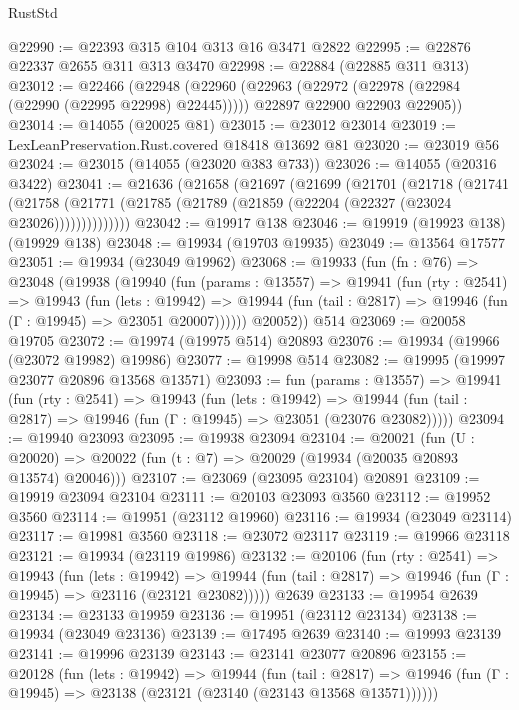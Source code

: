 \begin{lexlean}{RustStd}
\begin{coremodule}
@22990 := @22393 @315 @104 @313 @16 @3471 @2822
@22995 := @22876 @22337 @2655 @311 @313 @3470
@22998 := @22884 (@22885 @311 @313)
@23012 := @22466
    (@22948
      (@22960
        (@22963 (@22972 (@22978 (@22984 (@22990 (@22995 @22998) @22445)))))
        @22897
        @22900
        @22903
        @22905))
@23014 := @14055 (@20025 @81)
@23015 := @23012 @23014
@23019 := LexLeanPreservation.Rust.covered @18418 @13692 @81
@23020 := @23019 @56
@23024 := @23015 (@14055 (@23020 @383 @733))
@23026 := @14055 (@20316 @3422)
@23041 := @21636
    (@21658
      (@21697
        (@21699
          (@21701
            (@21718
              (@21741
                (@21758 (@21771 (@21785 (@21789 (@21859 (@22204 (@22327 (@23024 @23026))))))))))))))
@23042 := @19917 @138
@23046 := @19919 (@19923 @138) (@19929 @138)
@23048 := @19934 (@19703 @19935)
@23049 := @13564 @17577
@23051 := @19934 (@23049 @19962)
@23068 := @19933
    (fun (fn : @76) =>
    @23048
      (@19938
        (@19940
          (fun (params : @13557) =>
          @19941
            (fun (rty : @2541) =>
            @19943
              (fun (lets : @19942) =>
              @19944 (fun (tail : @2817) => @19946 (fun (Γ : @19945) => @23051 @20007))))))
        @20052))
    @514
@23069 := @20058 @19705
@23072 := @19974 (@19975 @514) @20893
@23076 := @19934 (@19966 (@23072 @19982) @19986)
@23077 := @19998 @514
@23082 := @19995 (@19997 @23077 @20896 @13568 @13571)
@23093 := fun (params : @13557) =>
  @19941
    (fun (rty : @2541) =>
    @19943
      (fun (lets : @19942) =>
      @19944 (fun (tail : @2817) => @19946 (fun (Γ : @19945) => @23051 (@23076 @23082)))))
@23094 := @19940 @23093
@23095 := @19938 @23094
@23104 := @20021
    (fun (U : @20020) => @20022 (fun (t : @7) => @20029 (@19934 (@20035 @20893 @13574) @20046)))
@23107 := @23069 (@23095 @23104) @20891
@23109 := @19919 @23094 @23104
@23111 := @20103 @23093 @3560
@23112 := @19952 @3560
@23114 := @19951 (@23112 @19960)
@23116 := @19934 (@23049 @23114)
@23117 := @19981 @3560
@23118 := @23072 @23117
@23119 := @19966 @23118
@23121 := @19934 (@23119 @19986)
@23132 := @20106
    (fun (rty : @2541) =>
    @19943
      (fun (lets : @19942) =>
      @19944 (fun (tail : @2817) => @19946 (fun (Γ : @19945) => @23116 (@23121 @23082)))))
    @2639
@23133 := @19954 @2639
@23134 := @23133 @19959
@23136 := @19951 (@23112 @23134)
@23138 := @19934 (@23049 @23136)
@23139 := @17495 @2639
@23140 := @19993 @23139
@23141 := @19996 @23139
@23143 := @23141 @23077 @20896
@23155 := @20128
    (fun (lets : @19942) =>
    @19944
      (fun (tail : @2817) =>
      @19946 (fun (Γ : @19945) => @23138 (@23121 (@23140 (@23143 @13568 @13571))))))

\end{coremodule}
\end{lexlean}
